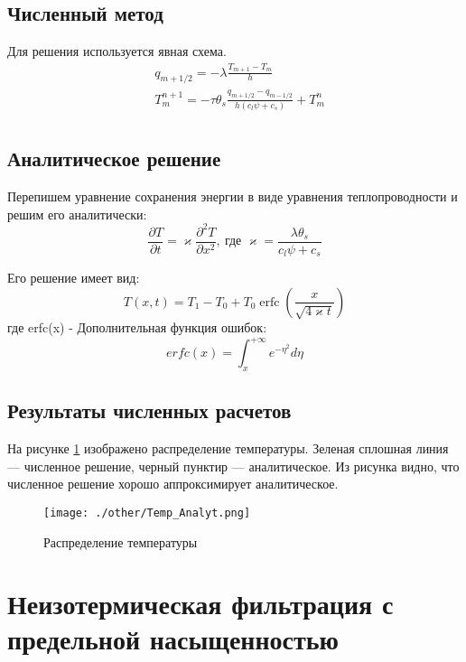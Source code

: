 \documentclass[12pt,a4paper]{article}
\newcommand{\pd}[2]{\frac{\partial #1}{\partial #2}}
\begin{document}
\subsection{Численный метод}
Для решения используется явная схема.
\begin{equation}
\begin{aligned}
&q_{m+1/2} = - \lambda\frac{T_{m+1} - T_m}{h}\\
&T_m^{n+1} = - \tau \theta_s\frac{q_{m+1/2} - q_{m-1/2}}{h(c_l \psi + c_s)} + T_m^n\\
\label{termal_razn}
\end{aligned}
\end{equation}
\subsection{Аналитическое решение}
Перепишем уравнение сохранения энергии в виде уравнения теплопроводности и решим его аналитически:
\begin{equation}
\pd{T}{t} = \varkappa\pd{^2 T}{x^2},\ \text{где } \varkappa = \frac{\lambda \theta_s}{c_l \psi +  c_s}
\end{equation}

Его решение имеет вид:
\begin{equation}
T(x,t) = T_1-T_0 + T_0 \operatorname{erfc} \left(\frac{x}{\sqrt{4\varkappa t}}\right)	
\end{equation}
где erfc(x) - Дополнительная функция ошибок:
$$
erfc(x) = \int_{x}^{+\infty}e^{- \eta^2}d\eta
$$
\subsection{Результаты численных расчетов}
На рисунке \ref{Temp_pict} изображено распределение температуры. Зеленая сплошная линия --- численное решение, черный пунктир --- аналитическое. Из рисунка видно, что численное решение хорошо аппроксимирует аналитическое.
\begin{figure}[h!]
\begin{center}
\texttt{[image: ./other/Temp\_Analyt.png]}
\caption{Распределение температуры}
\label{Temp_pict}
\end{center}
\end{figure}
\newpage
\section{Неизотермическая фильтрация с предельной насыщенностью}
\end{document}
